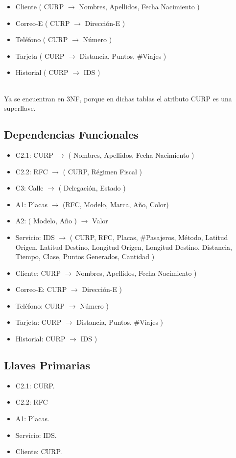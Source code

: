 \documentclass{article}
\begin{document}
      \begin{itemize}
      \item Cliente ( CURP $\rightarrow$ Nombres, Apellidos, Fecha Nacimiento )
      \item Correo-E ( CURP $\rightarrow$ Dirección-E )
      \item Teléfono ( CURP $\rightarrow$ Número )
      \item Tarjeta ( CURP $\rightarrow$ Distancia, Puntos, $\#$Viajes )
      \item Historial ( CURP $\rightarrow$ IDS )
      \end{itemize}\\
      
      Ya se encuentran en 3NF, porque en dichas tablas el atributo CURP es una superllave.
      
      \subsection{Dependencias Funcionales}
      \begin{itemize}
      \item C2.1: CURP $\rightarrow$ ( Nombres, Apellidos, Fecha Nacimiento )
      \item C2.2: RFC $\rightarrow$ ( CURP, Régimen Fiscal )
      \item C3: Calle $\rightarrow$ ( Delegación, Estado )
      \item A1: Placas $\rightarrow$ (RFC, Modelo, Marca, Año, Color)
      \item A2: ( Modelo, Año ) $\rightarrow$ Valor
      \item Servicio: IDS $\rightarrow$ ( CURP, RFC, Placas, $\#$Pasajeros,
        Método, Latitud Origen, Latitud Destino, Longitud Origen, Longitud Destino, Distancia,
        Tiempo, Clase, Puntos Generados, Cantidad )
      \item Cliente: CURP $\rightarrow$ Nombres, Apellidos, Fecha Nacimiento )
      \item Correo-E: CURP $\rightarrow$ Dirección-E )
      \item Teléfono: CURP $\rightarrow$ Número )
      \item Tarjeta: CURP $\rightarrow$ Distancia, Puntos, $\#$Viajes )
      \item Historial: CURP $\rightarrow$ IDS )
      \end{itemize}
      
      \subsection{Llaves Primarias} 
      \begin{multicols}{3}
        \begin{itemize}
        \item C2.1: CURP.
        \item C2.2: RFC
        \item A1: Placas.
        \item Servicio: IDS.
        \item Cliente: CURP.
        \end{itemize}
      \end{multicols}
      
\end{document}
